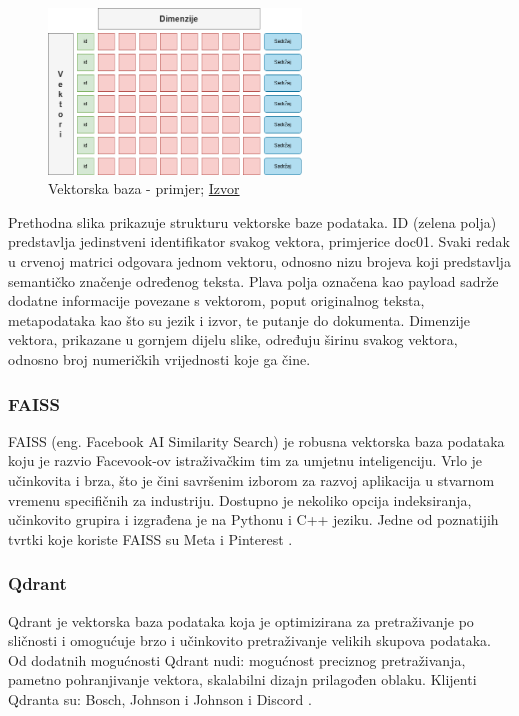 \documentclass[]{foi}
\begin{document}
\begin{figure}[h]
  \centering
  \includegraphics[width=0.6\textwidth]{./assets/payload.png}
  \caption{Vektorska baza - primjer; \href{https://tinyurl.com/469fzf35}{Izvor}}
  \label{fig:slika10}
\end{figure}

Prethodna slika prikazuje strukturu vektorske baze podataka. ID (zelena polja) predstavlja jedinstveni identifikator svakog vektora, 
primjerice doc01. Svaki redak u crvenoj matrici odgovara jednom vektoru, odnosno nizu brojeva koji predstavlja semantičko značenje 
određenog teksta. Plava polja označena kao payload sadrže dodatne informacije povezane s vektorom, poput originalnog teksta, metapodataka 
kao što su jezik i izvor, te putanje do dokumenta. Dimenzije vektora, prikazane u gornjem dijelu slike, određuju širinu svakog vektora, 
odnosno broj numeričkih vrijednosti koje ga čine.
\newpage

\subsubsection{FAISS}
FAISS (eng. Facebook AI Similarity Search) je robusna vektorska baza podataka koju je razvio Facevook-ov istraživačkim tim za umjetnu inteligenciju. Vrlo je učinkovita i brza, što je čini 
savršenim izborom za razvoj aplikacija u stvarnom vremenu specifičnih za industriju. Dostupno je nekoliko opcija indeksiranja, učinkovito grupira i izgrađena je 
na Pythonu i C++ jeziku. Jedne od poznatijih tvrtki koje koriste FAISS su Meta i Pinterest \cite{baghel2025vectors}. 

\subsubsection{Qdrant}
Qdrant je vektorska baza podataka koja je optimizirana za pretraživanje po sličnosti i omogućuje brzo i učinkovito pretraživanje velikih skupova podataka. Od dodatnih mogućnosti Qdrant nudi:
mogućnost preciznog pretraživanja, pametno pohranjivanje vektora, skalabilni dizajn prilagođen oblaku. Klijenti Qdranta su: Bosch, Johnson i Johnson i Discord \cite{baghel2025vectors}.
\end{document}
